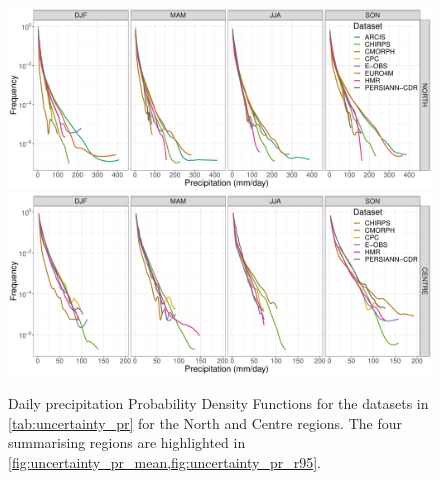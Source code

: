 \begin{figure}
    \centering
        \includegraphics[width=0.8\textheight]{figures/uncertainty/pdf_NORTH_lines}
        \includegraphics[width=0.8\textheight]{figures/uncertainty/pdf_CENTRE_lines}
    \caption[Precipitation distribution (PDFs): uncertainty over Italy (1)]{
        Daily precipitation Probability Density Functions for the datasets in \cref{tab:uncertainty_pr} for the North and Centre regions. The four summarising regions are highlighted in \cref{fig:uncertainty_pr_mean,fig:uncertainty_pr_r95}.
    }\label{fig:uncertainty_pr_pdf1}
\end{figure}
